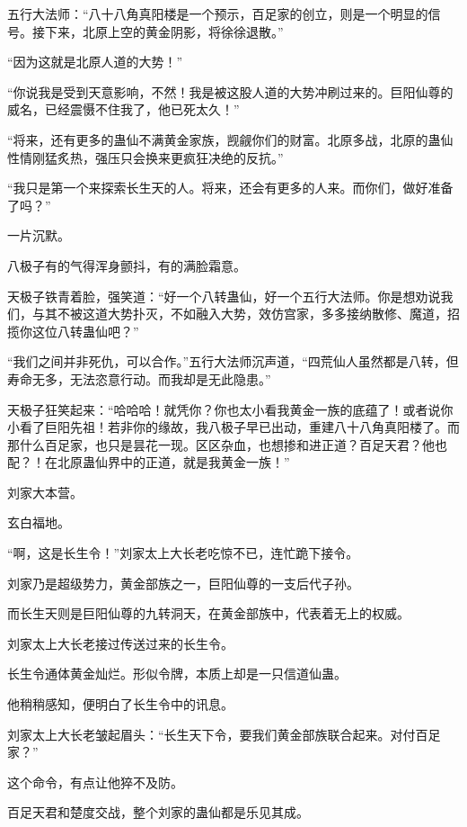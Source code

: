 
\begin{this_body}

五行大法师：“八十八角真阳楼是一个预示，百足家的创立，则是一个明显的信号。接下来，北原上空的黄金阴影，将徐徐退散。”

“因为这就是北原人道的大势！”

“你说我是受到天意影响，不然！我是被这股人道的大势冲刷过来的。巨阳仙尊的威名，已经震慑不住我了，他已死太久！”

“将来，还有更多的蛊仙不满黄金家族，觊觎你们的财富。北原多战，北原的蛊仙性情刚猛炙热，强压只会换来更疯狂决绝的反抗。”

“我只是第一个来探索长生天的人。将来，还会有更多的人来。而你们，做好准备了吗？”

一片沉默。

八极子有的气得浑身颤抖，有的满脸霜意。

天极子铁青着脸，强笑道：“好一个八转蛊仙，好一个五行大法师。你是想劝说我们，与其不被这道大势扑灭，不如融入大势，效仿宫家，多多接纳散修、魔道，招揽你这位八转蛊仙吧？”

“我们之间并非死仇，可以合作。”五行大法师沉声道，“四荒仙人虽然都是八转，但寿命无多，无法恣意行动。而我却是无此隐患。”

天极子狂笑起来：“哈哈哈！就凭你？你也太小看我黄金一族的底蕴了！或者说你小看了巨阳先祖！若非你的缘故，我八极子早已出动，重建八十八角真阳楼了。而那什么百足家，也只是昙花一现。区区杂血，也想掺和进正道？百足天君？他也配？！在北原蛊仙界中的正道，就是我黄金一族！”

刘家大本营。

玄白福地。

“啊，这是长生令！”刘家太上大长老吃惊不已，连忙跪下接令。

刘家乃是超级势力，黄金部族之一，巨阳仙尊的一支后代子孙。

而长生天则是巨阳仙尊的九转洞天，在黄金部族中，代表着无上的权威。

刘家太上大长老接过传送过来的长生令。

长生令通体黄金灿烂。形似令牌，本质上却是一只信道仙蛊。

他稍稍感知，便明白了长生令中的讯息。

刘家太上大长老皱起眉头：“长生天下令，要我们黄金部族联合起来。对付百足家？”

这个命令，有点让他猝不及防。

百足天君和楚度交战，整个刘家的蛊仙都是乐见其成。


\end{this_body}
